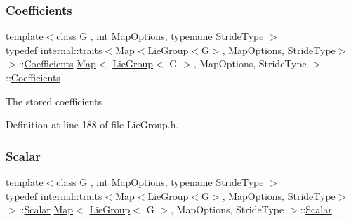 \subsubsection{\texorpdfstring{Coefficients}{Coefficients}}
{\footnotesize\ttfamily template$<$class G , int Map\+Options, typename Stride\+Type $>$ \\
typedef internal\+::traits$<$\hyperlink{class_map_3_01_lie_group_3_01_g_01_4_00_01_map_options_00_01_stride_type_01_4_a141753f9a4186911b53b5b25cfd716ed}{Map}$<$\hyperlink{class_lie_group}{Lie\+Group}$<$G$>$, Map\+Options, Stride\+Type$>$ $>$\+::\hyperlink{class_map_3_01_lie_group_3_01_g_01_4_00_01_map_options_00_01_stride_type_01_4_a3140b440390b3c15c7361ab182a91f91}{Coefficients} \hyperlink{class_map_3_01_lie_group_3_01_g_01_4_00_01_map_options_00_01_stride_type_01_4_a141753f9a4186911b53b5b25cfd716ed}{Map}$<$ \hyperlink{class_lie_group}{Lie\+Group}$<$ G $>$, Map\+Options, Stride\+Type $>$\+::\hyperlink{class_map_3_01_lie_group_3_01_g_01_4_00_01_map_options_00_01_stride_type_01_4_a3140b440390b3c15c7361ab182a91f91}{Coefficients}}

The stored coefficients 

Definition at line 188 of file Lie\+Group.\+h.

\hypertarget{class_map_3_01_lie_group_3_01_g_01_4_00_01_map_options_00_01_stride_type_01_4_ac0fdd69f3b12cdc0b88be71c2283e9ae}{}\label{class_map_3_01_lie_group_3_01_g_01_4_00_01_map_options_00_01_stride_type_01_4_ac0fdd69f3b12cdc0b88be71c2283e9ae} 
\subsubsection{\texorpdfstring{Scalar}{Scalar}}
{\footnotesize\ttfamily template$<$class G , int Map\+Options, typename Stride\+Type $>$ \\
typedef internal\+::traits$<$\hyperlink{class_map_3_01_lie_group_3_01_g_01_4_00_01_map_options_00_01_stride_type_01_4_a141753f9a4186911b53b5b25cfd716ed}{Map}$<$\hyperlink{class_lie_group}{Lie\+Group}$<$G$>$, Map\+Options, Stride\+Type$>$ $>$\+::\hyperlink{class_map_3_01_lie_group_3_01_g_01_4_00_01_map_options_00_01_stride_type_01_4_ac0fdd69f3b12cdc0b88be71c2283e9ae}{Scalar} \hyperlink{class_map_3_01_lie_group_3_01_g_01_4_00_01_map_options_00_01_stride_type_01_4_a141753f9a4186911b53b5b25cfd716ed}{Map}$<$ \hyperlink{class_lie_group}{Lie\+Group}$<$ G $>$, Map\+Options, Stride\+Type $>$\+::\hyperlink{class_map_3_01_lie_group_3_01_g_01_4_00_01_map_options_00_01_stride_type_01_4_ac0fdd69f3b12cdc0b88be71c2283e9ae}{Scalar}}

